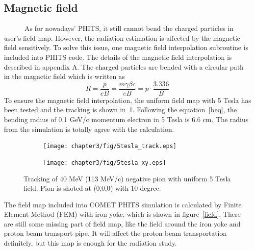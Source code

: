  \subsection{Magnetic field}
~~~~~~As for nowadays' PHITS, it still cannot bend the charged particles in user's field map.
However, the radiation estimation is affected by the magnetic field sensitively.
To solve this issue, one magnetic field interpolation subroutine is included into PHITS code.
The details of the magnetic field interpolation is described in appendix A.
The charged particles are bended with a circular path in the magnetic field which is written as
\begin{equation}
 R = \frac{p}{eB} = \frac{m\gamma \beta c}{eB} = p \cdot \frac{3.336}{B}
\label{beq}
\end{equation}
To ensure the magnetic field interpolation, the uniform field map with 5 Tesla has been tested and the tracking is shown in~\ref{2uniform}.
Following the equation~\ref{beq}, the bending radius of 0.1 GeV/c momentum electron in 5 Tesla is 6.6 cm.
The radius from the simulation is totally agree with the calculation.
\begin{figure}[H]
 \begin{subfigure}{0.3\textwidth}
 \centering
 \texttt{[image: chapter3/fig/5tesla\_track.eps]}
 \end{subfigure}
 \hspace{0.2\textwidth}
 \begin{subfigure}{0.3\textwidth}
 \centering
 \texttt{[image: chapter3/fig/5tesla\_xy.eps]}
 \end{subfigure}
 \caption{Tracking of 40 MeV (113 MeV/c) negative pion with uniform 5 Tesla field. Pion is shoted at (0,0,0) with 10 degree.}
 \label{2uniform}
\end{figure}
The field map included into COMET PHITS simulation is calculated by Finite Element Method (FEM) with iron yoke, which is shown in figure~\ref{field}.
There are still some missing part of field map, like the field around the iron yoke and proton beam transport pipe.
It will affect the proton beam transportation definitely, but this map is enough for the radiation study.

